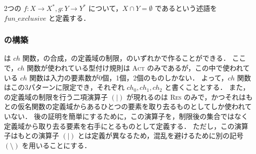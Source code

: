 \begin{dfn}
  2つの \tmp $f : X \rightarrow X^*, g : Y \rightarrow Y^*$ について，$X \cap Y = \emptyset$ であるという述語を $fun\_exclusive$ と定義する．
\end{dfn}




\subsubsection{\tmp の構築}

\tmp は $ch$ 関数，\tmp の合成，\tmp の定義域の制限，のいずれかで作ることができる．
ここで，$ch$ 関数が使われている型付け規則は \textsc{Act} のみであるが，この中で使われている $ch$ 関数は入力の要素数が0個，1個，2個のものしかない．
よって，$ch$ 関数はこの3パターンに限定でき，それぞれ $ch_0, ch_1, ch_2$ と書くこととする．
また，\tmp の定義域の制限を行う二項演算子 $(|)$ が現れるのは \textsc{Res} のみで，かつそれはもとの仮名関数の定義域からあるひとつの要素を取り去るものとしてしか使われていない．
後の証明を簡単にするために，この演算子を，制限後の集合ではなく定義域から取り去る要素を右手にとるものとして定義する．
ただし，この演算子はもとの演算子 $(|)$ とは定義が異なるため，混乱を避けるために別の記号 $(\setminus)$ を用いることにする．

